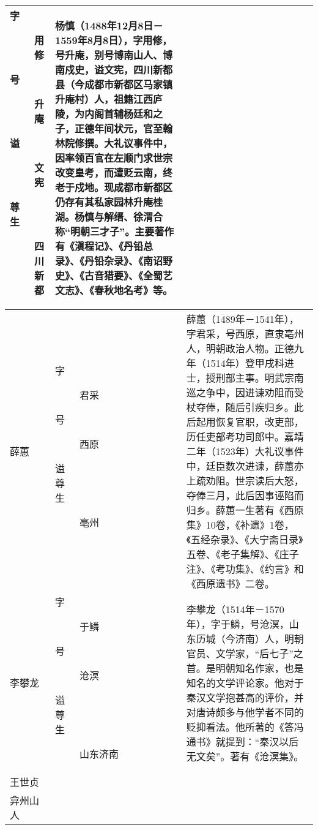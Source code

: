 \begin{longtable}{|>{\centering\namefont\heiti}m{2em}|>{\centering\tiny}m{3.0em}|>{\xzfont\kaiti}m{7em}|}
\begin{description}
  \item[字] 用修
  \item[号] 升庵
  \item[谥] 文宪
  \item[尊] 
  \item[生] 四川新都
  \end{description} & 杨慎（1488年12月8日－1559年8月8日），字用修，号升庵，别号博南山人、博南戍史，谥文宪，四川新都县（今成都市新都区马家镇升庵村）人，祖籍江西庐陵，为内阁首辅杨廷和之子，正德年间状元，官至翰林院修撰。大礼议事件中，因率领百官在左顺门求世宗改变皇考，而遭贬云南，终老于戍地。现成都市新都区仍存有其私家园林升庵桂湖。杨慎与解缙、徐渭合称“明朝三才子”。主要著作有《滇程记》、《丹铅总录》、《丹铅杂录》、《南诏野史》、《古音猎要》、《全蜀艺文志》、《春秋地名考》等。 \tabularnewline\hline
  薛蕙 & \begin{description}
  \item[字] 君采
  \item[号] 西原
  \item[谥] 
  \item[尊] 
  \item[生] 亳州
  \end{description} & 薛蕙（1489年－1541年），字君采，号西原，直隶亳州人，明朝政治人物。正德九年（1514年）登甲戌科进士，授刑部主事。明武宗南巡之争中，因进谏劝阻而受杖夺俸，随后引疾归乡。此后起用恢复官职，改吏部，历任吏部考功司郎中。嘉靖二年（1523年）大礼议事件中，廷臣数次进谏，薛蕙亦上疏劝阻。世宗读后大怒，夺俸三月，此后因事诬陷而归乡。薛蕙一生著有《西原集》10卷，《补遗》1卷，《五经杂录》、《大宁斋日录》五卷、《老子集解》、《庄子注》、《考功集》、《约言》和《西原遗书》二卷。 \tabularnewline\hline
  李攀龙 & \begin{description}
  \item[字] 于鳞
  \item[号] 沧溟
  \item[谥] 
  \item[尊] 
  \item[生] 山东济南
  \end{description} & 李攀龙（1514年－1570年），字于鳞，号沧溟，山东历城（今济南）人，明朝官员、文学家，“后七子”之首。是明朝知名作家，也是知名的文学评论家。他对于秦汉文学抱甚高的评价，并对唐诗颇多与他学者不同的贬抑看法。他所著的《答冯通书》就提到：“秦汉以后无文矣”。著有《沧溟集》。 \tabularnewline\hline
  王世贞 & \begin{description}
  \item[字] 元美
  \item[号] 凤洲\\弇州山人

\end{description}
\end{longtable}
